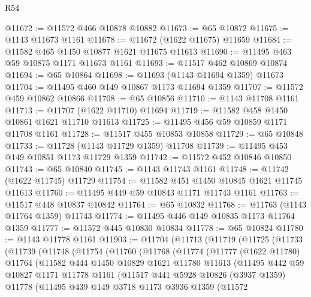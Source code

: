 \begin{lexlean}{R54}
\begin{coremodule}
@11672 := @11572 @466 @10878 @10882
@11673 := @65 @10872
@11675 := @1143 @11673 @1161
@11678 := @11672 (@1622 @11675) @11659
@11684 := @11582 @465 @1450 @10877 @1621 @11675 @11613
@11690 := @11495 @463 @59 @10875 @1171 @11673 @1161
@11693 := @11517 @462 @10869 @10874
@11694 := @65 @10864
@11698 := @11693 (@1143 @11694 @1359) @11673
@11704 := @11495 @460 @149 @10867 @1173 @11694 @1359
@11707 := @11572 @459 @10862 @10866
@11708 := @65 @10856
@11710 := @1143 @11708 @1161
@11713 := @11707 (@1622 @11710) @11694
@11719 := @11582 @458 @1450 @10861 @1621 @11710 @11613
@11725 := @11495 @456 @59 @10859 @1171 @11708 @1161
@11728 := @11517 @455 @10853 @10858
@11729 := @65 @10848
@11733 := @11728 (@1143 @11729 @1359) @11708
@11739 := @11495 @453 @149 @10851 @1173 @11729 @1359
@11742 := @11572 @452 @10846 @10850
@11743 := @65 @10840
@11745 := @1143 @11743 @1161
@11748 := @11742 (@1622 @11745) @11729
@11754 := @11582 @451 @1450 @10845 @1621 @11745 @11613
@11760 := @11495 @449 @59 @10843 @1171 @11743 @1161
@11763 := @11517 @448 @10837 @10842
@11764 := @65 @10832
@11768 := @11763 (@1143 @11764 @1359) @11743
@11774 := @11495 @446 @149 @10835 @1173 @11764 @1359
@11777 := @11572 @445 @10830 @10834
@11778 := @65 @10824
@11780 := @1143 @11778 @1161
@11903 := @11704
    (@11713
      (@11719
        (@11725
          (@11733
            (@11739
              (@11748
                (@11754
                  (@11760
                    (@11768
                      (@11774
                        (@11777
                          (@1622 @11780)
                          @11764
                          (@11582
                            @444
                            @1450
                            @10829
                            @1621
                            @11780
                            @11613
                            (@11495
                              @442
                              @59
                              @10827
                              @1171
                              @11778
                              @1161
                              (@11517
                                @441
                                @5928
                                @10826
                                (@3937 @1359)
                                @11778
                                (@11495
                                  @439
                                  @149
                                  @3718
                                  @1173
                                  @3936
                                  @1359
                                  (@11572

\end{coremodule}
\end{lexlean}
